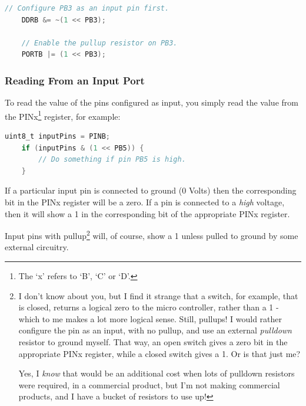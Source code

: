 \begin{lstlisting}[language=C,numbers={none}]
	// Configure PB3 as an input pin first.
	DDRB &= ~(1 << PB3);
	
	// Enable the pullup resistor on PB3.
	PORTB |= (1 << PB3);
\end{lstlisting}


\subsubsection{Reading From an Input Port}\label{avr-ports-input-reading}

To read the value of the pins configured as input, you simply read the value from the PINx\footnote{The `x' refers to `B', `C' or `D'.} register, for example:

\begin{lstlisting}[language=C,numbers={none}]
	uint8_t inputPins = PINB;
	if (inputPins & (1 << PB5)) {
		// Do something if pin PB5 is high.
	}
\end{lstlisting}


If a particular input pin is connected to ground (0 Volts) then the corresponding bit in the PINx register will be a zero. If a pin is connected to a \emph{high} voltage, then it will show a 1 in the corresponding bit of the appropriate PINx register.

Input pins with pullup\footnote{%
	I don't know about you, but I find it strange that a switch, for example, that is closed, returns a logical zero to the micro controller, rather than a 1 - which to me makes a lot more logical sense. Still, pullups! I would rather configure the pin as an input, with no pullup, and use an external \emph{pulldown} resistor to ground myself. That way, an open switch gives a zero bit in the appropriate PINx register, while a closed switch gives a 1. Or is that just me? 
	
	Yes, I \emph{know} that would be an additional cost when lots of pulldown resistors were required, in a commercial product, but I'm not making commercial products, and I have a bucket of resistors to use up!%
} will, of course, show a 1 unless pulled to ground by some external circuitry.




